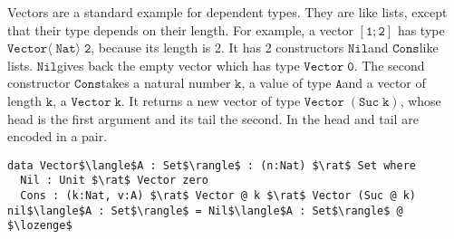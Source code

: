 \documentclass[a4paper,cleardoubleempty,BCOR1cm]{scrbook}
\begin{document}
Vectors are a standard example for dependent types. They are like lists,
except that their type depends on their length. For example, a vector $\mathtt{[1;2]}$
has type $\mathtt{Vector\langle\;Nat\rangle\;2}$, because its length is 2. It has 2
constructors $\mathtt{Nil}$\;and $\mathtt{Cons}$\;like lists. $\mathtt{Nil}$\;gives back the empty vector
which has type $\mathtt{Vector\;0}$. The second constructor $\mathtt{Cons}$\;takes a natural
number $\mathtt{k}$, a value of type $\mathtt{A}$\;and a vector of length $\mathtt{k}$, a $\mathtt{Vector\;k}$. It
returns a new vector of type $\mathtt{Vector\;(Suc\;k)}$, whose head is the first
argument and its tail the second. In \cite{basold2016type} the head and tail
are encoded in a pair.

\begin{lstlisting}
data Vector$\langle$A : Set$\rangle$ : (n:Nat) $\rat$ Set where
  Nil : Unit $\rat$ Vector zero
  Cons : (k:Nat, v:A) $\rat$ Vector @ k $\rat$ Vector (Suc @ k)
nil$\langle$A : Set$\rangle$ = Nil$\langle$A : Set$\rangle$ @ $\lozenge$
\end{lstlisting}
\end{document}
